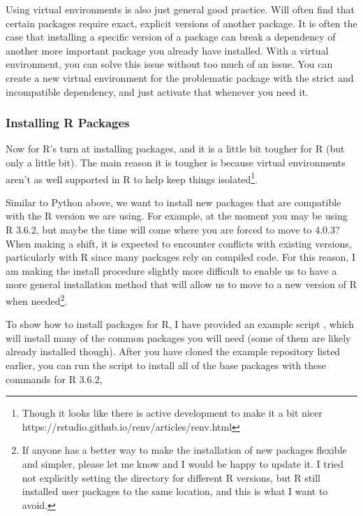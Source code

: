 %
%
%
\par
%
%
%
Using virtual environments is also just general good practice. Will often find that certain packages require exact, explicit versions of another package. It is often the case that installing a specific version of a package can break a dependency of another more important package you already have installed. With a virtual environment, you can solve this issue without too much of an issue. You can create a new virtual environment for the problematic package with the strict and incompatible dependency, and just activate that whenever you need it. 
%
%
%
\subsubsection{Installing R Packages}
\label{sec:install}
Now for R's turn at installing packages, and it is a little bit tougher for R (but only a little bit). The main reason it is tougher is because virtual environments aren't as well supported in R to help keep things isolated\footnote{Though it looks like there is active development to make it a bit nicer https://rstudio.github.io/renv/articles/renv.html}.
%
%
\par
%
%
%
Similar to Python above, we want to install new packages that are compatible with the R version we are using. For example, at the moment you may be using R 3.6.2, but maybe the time will come where you are forced to move to 4.0.3? When making a shift, it is expected to encounter conflicts with existing versions, particularly with R since many packages rely on compiled  code. For this reason, I am making the install procedure slightly more difficult to enable us to have a more general installation method that will allow us to move to a new version of R when needed\footnote{If anyone has a better way to make the installation of new packages flexible and simpler, please let me know and I would be happy to update it. I tried not explicitly setting the  directory for different R versions, but R still installed user packages to the same location, and this is what I want to avoid.}.
%
%
%
\par
%
%
%
To show how to install packages for R, I have provided an example script , which will install many of the common packages you will need (some of them are likely already installed though). After you have cloned the example repository listed earlier, you can run the script to install all of the base packages with these commands for R 3.6.2,
%
%
%
\par
